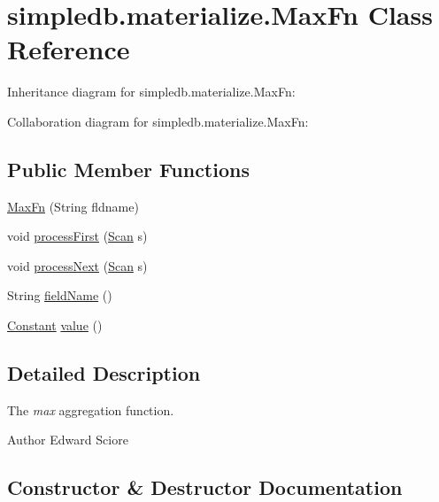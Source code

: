 \hypertarget{classsimpledb_1_1materialize_1_1MaxFn}{}\section{simpledb.\+materialize.\+Max\+Fn Class Reference}
\label{classsimpledb_1_1materialize_1_1MaxFn}


Inheritance diagram for simpledb.\+materialize.\+Max\+Fn\+:


Collaboration diagram for simpledb.\+materialize.\+Max\+Fn\+:
\subsection*{Public Member Functions}
\begin{DoxyCompactItemize}
\item 
\hyperlink{classsimpledb_1_1materialize_1_1MaxFn_a8f4c63ecc000bf3679a452f12153a65b}{Max\+Fn} (String fldname)
\item 
void \hyperlink{classsimpledb_1_1materialize_1_1MaxFn_aeb7c0c3b7beddb944fac6f843f288cae}{process\+First} (\hyperlink{interfacesimpledb_1_1query_1_1Scan}{Scan} s)
\item 
void \hyperlink{classsimpledb_1_1materialize_1_1MaxFn_a4ce58a04c1c3891b611771630a33dc74}{process\+Next} (\hyperlink{interfacesimpledb_1_1query_1_1Scan}{Scan} s)
\item 
String \hyperlink{classsimpledb_1_1materialize_1_1MaxFn_a51dc995821073599a8780df18b86ae9f}{field\+Name} ()
\item 
\hyperlink{classsimpledb_1_1query_1_1Constant}{Constant} \hyperlink{classsimpledb_1_1materialize_1_1MaxFn_a00a636276f06c0599ebbe3dbc560a4e6}{value} ()
\end{DoxyCompactItemize}


\subsection{Detailed Description}
The {\itshape max} aggregation function. \begin{DoxyAuthor}{Author}
Edward Sciore 
\end{DoxyAuthor}


\subsection{Constructor \& Destructor Documentation}
\mbox{\label{classsimpledb_1_1materialize_1_1MaxFn_a8f4c63ecc000bf3679a452f12153a65b}} 
